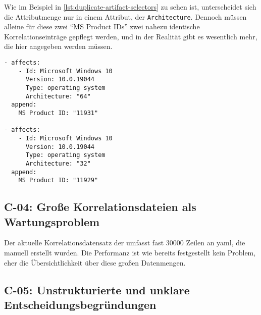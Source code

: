 Wie im Beispiel in \autoref{lst:duplicate-artifact-selectors} zu sehen ist, unterscheidet sich die Attributmenge nur in einem Attribut, der \texttt{Architecture}.
Dennoch müssen alleine für diese zwei \enquote{MS Product IDs} zwei nahezu identische Korrelationseinträge gepflegt werden, und in der Realität gibt es wesentlich mehr, die hier angegeben werden müssen.

\begin{lstlisting}[style=yaml,caption={Zwei Korrelationseinträge mit nahezu identischen Attributen},label={lst:duplicate-artifact-selectors}]
- affects:
    - Id: Microsoft Windows 10
      Version: 10.0.19044
      Type: operating system
      Architecture: "64"
  append:
    MS Product ID: "11931"

- affects:
    - Id: Microsoft Windows 10
      Version: 10.0.19044
      Type: operating system
      Architecture: "32"
  append:
    MS Product ID: "11929"
\end{lstlisting}

\subsection{C-04: Große Korrelationsdateien als Wartungsproblem}\label{subsec:c-04-groe-und-unubersichtliche-yaml-dateien}


Der aktuelle Korrelationsdatensatz der \metaeffektsp umfasst fast 30000 Zeilen an \acrshort{yaml}, die manuell erstellt wurden.
Die Performanz ist wie bereits festgestellt kein Problem, eher die Übersichtlichkeit über diese großen Datenmengen.

\subsection{C-05: Unstrukturierte und unklare Entscheidungsbegründungen}\label{subsec:c-05-reason-not-good-enough}


